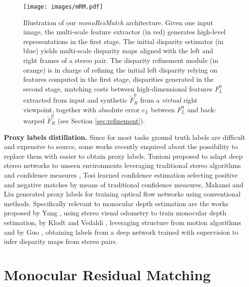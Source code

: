 \documentclass[10pt,twocolumn,letterpaper]{article}
\begin{document}
\begin{figure*}
\centering
\texttt{[image: images/mRM.pdf]}
\caption{Illustration of our \textit{monoResMatch} architecture. Given one input image, the multi-scale feature extractor (in red) generates high-level representations in the first stage. The initial disparity estimator (in blue) yields multi-scale disparity maps aligned with the left and right frames of a stereo pair. The disparity refinement module (in orange) is in charge of refining the initial left disparity relying on features computed in the first stage, disparities generated in the second stage, matching costs between high-dimensional features $F_L^0$ extracted from input and synthetic $\tilde{F}_R^0$ from a \emph{virtual} right viewpoint, together with absolute error $e_L$ between $F_L^0$ and back-warped $\tilde{F}_R^0$ (see Section \ref{sec:refinement}). }
\label{fig:monoResMatch}
\end{figure*}     
\textbf{Proxy labels distillation.} Since for most tasks ground truth labels are difficult and expensive to source, some works recently enquired about the possibility to replace them with easier to obtain proxy labels. Tonioni \etal \cite{Tonioni_2017_ICCV} proposed to adapt deep stereo networks to unseen environments leveraging traditional stereo algorithms and confidence measures \cite{Poggi_2017_ICCV}, Tosi \etal \cite{Tosi_2017_BMVC} learned confidence estimation selecting positive and negative matches by means of traditional confidence measures, Makansi \etal \cite{makansi2018fusionnet} and Liu \etal \cite{DDFlow} generated proxy labels for training optical flow networks using conventional methods.
Specifically relevant to monocular depth estimation are the works proposed by Yang \etal \cite{yang2018deep}, using stereo visual odometry to train monocular depth estimation, by Klodt and Vedaldi \cite{Klodt_2018_ECCV}, leveraging structure from motion algorithms and by Guo \etal \cite{guo2018learning}, obtaining labels from a deep network trained with supervision to infer disparity maps from stereo pairs.




\section{Monocular Residual Matching}
\end{document}
